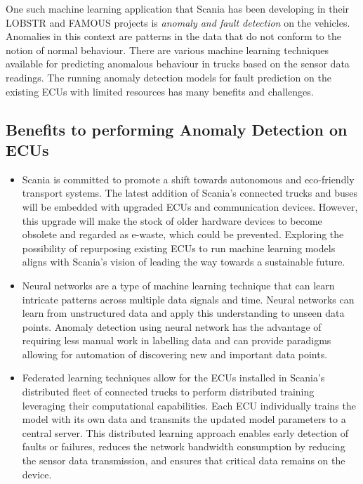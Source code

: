 One such machine learning application that Scania has been developing in their \textsc{LOBSTR} \cite{lobstr} and \textsc{FAMOUS} \cite{famous} projects is \textit{anomaly and fault detection} on the vehicles. Anomalies in this context are patterns in the data that do not conform to the notion of normal behaviour. There are various machine learning techniques available for predicting anomalous behaviour in trucks based on the sensor data readings. The running anomaly detection models for fault prediction on the existing ECUs with limited resources has many benefits and challenges.

\subsection*{Benefits to performing Anomaly Detection on ECUs}

\begin{itemize}
	\item Scania is committed to promote a shift towards autonomous and eco-friendly transport systems. The latest addition of Scania's connected trucks and buses will be embedded with upgraded ECUs and communication devices. However, this upgrade will make the stock of older hardware devices to become obsolete and regarded as e-waste, which could be prevented. Exploring the possibility of repurposing existing ECUs to run machine learning models aligns with Scania's vision of leading the way towards a sustainable future.
	\item Neural networks are a type of machine learning technique that can learn intricate patterns across multiple data signals and time. Neural networks can learn from unstructured data and apply this understanding to unseen data points. Anomaly detection using neural network has the advantage of requiring less manual work in labelling data and can provide paradigms allowing for automation of discovering new and important data points.
	\item Federated learning techniques allow for the ECUs installed in Scania's distributed fleet of connected trucks to perform distributed training leveraging their computational capabilities. Each ECU individually trains the model with its own data and transmits the updated model parameters to a central server. This distributed learning approach enables early detection of faults or failures, reduces the network bandwidth consumption by reducing the sensor data transmission, and ensures that critical data remains on the device.
\end{itemize}

